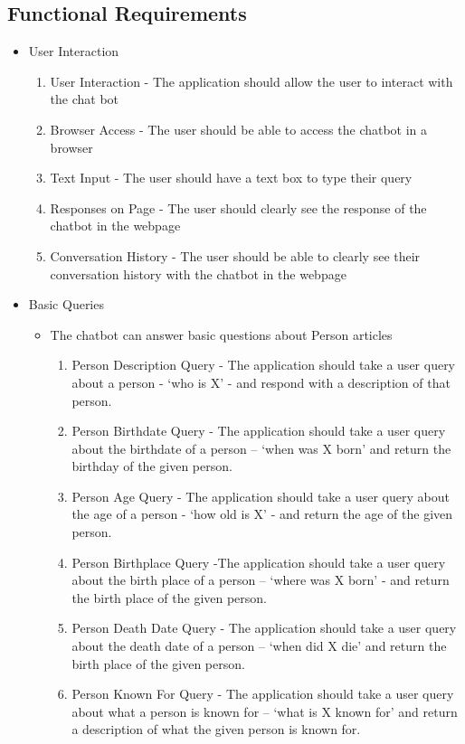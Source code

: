 \subsection{Functional Requirements}

\begin{itemize}
	\item User Interaction
	\begin{enumerate}[label*=F\arabic*.]
		\item User Interaction - The application should allow the user to interact with the chat bot
		\item Browser Access - The user should be able to access the chatbot in a browser
		\item Text Input - The user should have a text box to type their query
		\item Responses on Page - The user should clearly see the response of the chatbot in the webpage
		\item Conversation History - The user should be able to clearly see their conversation history with the chatbot in the webpage
	\end{enumerate}
	\item Basic Queries
	\begin{itemize}
		\item The chatbot can answer basic questions about Person articles
		\begin{enumerate}[resume*]
			\item Person Description Query - The application should take a user query about a person - ‘who is X’ - and respond with a description of that person.
			\item Person Birthdate Query - The application should take a user query about the birthdate of a person – ‘when was X born’ and return the birthday of the given person.
			\item Person Age Query - The application should take a user query about the age of a person - ‘how old is X’ - and return the age of the given person.
			\item Person Birthplace Query -The application should take a user query about the birth place of a person – ‘where was X born’ -  and return the birth place of the given person. 
			\item Person Death Date Query - The application should take a user query about the death date of a person – ‘when did X die’ and return the birth place of the given person. 
			\item Person Known For Query - The application should take a user query about what a person is known for – ‘what is X known for’ and return a description of what the given person is known for.

\end{enumerate}
\end{itemize}
\end{itemize}
